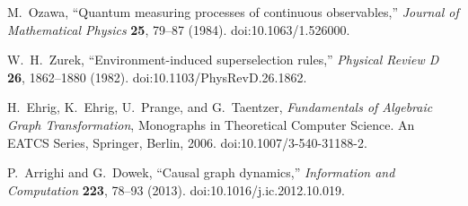 \documentclass[10pt,twoside,a5paper]{article}
\theoremstyle{definition}
\begin{document}
\begin{eref}
M.~Ozawa,
``Quantum measuring processes of continuous observables,''
\emph{Journal of Mathematical Physics} \textbf{25}, 79--87 (1984).
doi:10.1063/1.526000.

W.~H.~Zurek,
``Environment-induced superselection rules,''
\emph{Physical Review D} \textbf{26}, 1862--1880 (1982).
doi:10.1103/PhysRevD.26.1862.

H.~Ehrig, K.~Ehrig, U.~Prange, and G.~Taentzer,
\textit{Fundamentals of Algebraic Graph Transformation},
Monographs in Theoretical Computer Science. An EATCS Series,
Springer, Berlin, 2006.
doi:10.1007/3-540-31188-2.

P.~Arrighi and G.~Dowek,
``Causal graph dynamics,''
\textit{Information and Computation} \textbf{223}, 78--93 (2013).
doi:10.1016/j.ic.2012.10.019.

\end{eref}
\end{document}
